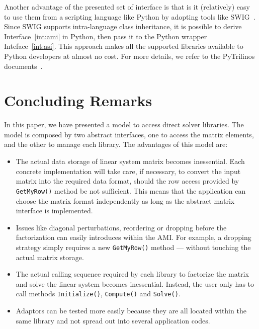 \documentclass[acmtocl]{acmtrans2m}
\begin{document}
Another advantage of the presented set of interface is that is it (relatively)
  easy to use them from a scripting language like Python by adopting tools
  like SWIG~\cite{swig}. Since SWIG supports intra-language class inheritance,
  it is possible to derive Interface~\ref{int:ami} in Python, then pass it
  to the Python wrapper Inteface~\ref{int:asi}. This approach makes all the
  supported libraries available to Python developers at almost no cost. For
  more details, we refer to the PyTrilinos
  documents~\cite{sala05pytrilinos,pytrilinos-la-guide}. 
  
\section{Concluding Remarks}
\label{sec:conclusions}

In this paper, we have presented a model to access direct
solver libraries. The model is composed by two abstract interfaces, one to
access the matrix elements, and the other to manage each library.
The advantages of this model are:
\begin{itemize}

\item The actual data storage of linear system matrix becomes inessential.
Each concrete implementation will take care, if necessary, to convert the
input matrix into the required data format, should the row access provided by
\verb!GetMyRow()! method be not sufficient. This means that the
application can choose the matrix format independently as long as the abstract
matrix interface is implemented.

\item Issues like diagonal perturbations, reordering or dropping before the
 factorization can easily introduces within the AMI. For example, a dropping
 strategy simply requires a new \verb!GetMyRow()! method --- without
 touching the actual matrix storage.

\item The actual calling sequence required by each library to factorize the
matrix and solve the linear system becomes inessential. Instead, the user only
has to call methods \verb!Initialize()!, \verb!Compute()! and
\verb!Solve()!.

\item Adaptors can be tested more easily because they are all located within
the same library and not spread out into several application codes.
\end{itemize}
\end{document}
